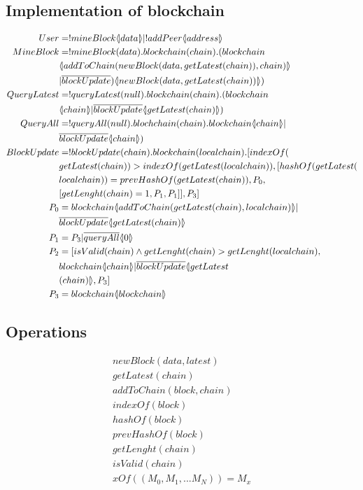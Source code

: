 \subsection{Implementation of blockchain}

\begin{align*}
    User &= !mineBlock \lift{}{data} |!addPeer\lift{}{address}\\
    MineBlock &= !mineBlock(data).blockchain(chain).(blockchain\\
        &\lift{}{addToChain(newBlock(data,getLatest(chain)),chain)}\\
        &|\overline{blockUpdate})\lift{}{newBlock(data, getLatest(chain))})\\
    QueryLatest &=!queryLatest(null).blockchain(chain).(blockchain\\
        &\lift{}{chain}|\overline{blockUpdate}\lift{}{getLatest(chain)})\\
        QueryAll &= !queryAll(null).blochchain(chain).blockchain\lift{}{chain}|\\
        &\overline{blockUpdate}\lift{}{chain})\\
    BlockUpdate &= !blockUpdate(chain).blockchain(localchain).[indexOf(\\
        &getLatest(chain))>indexOf(getLatest(localchain)),[hashOf(getLatest(\\
        &localchain))=prevHashOf(getLatest(chain)),P_0,\\
        &[getLenght(chain)=1,P_1,P_1]],P_3]\\
    P_0 &= blockchain\lift{}{addToChain(getLatest(chain),localchain)}|\\
        &\overline{blockUpdate}\lift{}{getLatest(chain)}\\
    P_1 &= P_3|\overline{queryAll}\lift{}{0}\\
    P_2 &= [isValid(chain) \land getLenght(chain) > getLenght(localchain),\\
        &blockchain\lift{}{chain}|\overline{blockUpdate}\lift{}{getLatest\\
        &(chain)},P_3]\\
    P_3 &= blockchain\lift{}{blockchain}
\end{align*}

\subsection{Operations}

\begin{align*}
    newBlock(data,latest)\\
    getLatest(chain)\\
    addToChain(block,chain)\\
    indexOf(block)\\
    hashOf(block)\\
    prevHashOf(block)\\
    getLenght(chain)\\
    isValid(chain)\\
    xOf((M_0,M_1,...M_N))=M_x
\end{align*}

